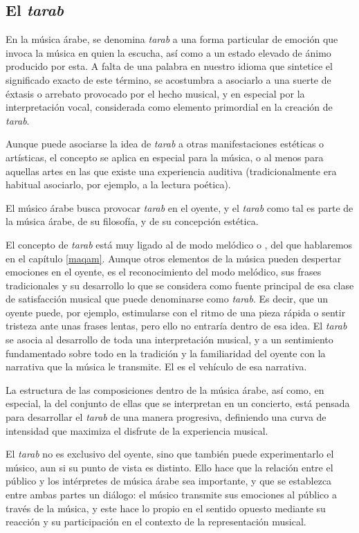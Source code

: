     \subsection{El \emph{tarab}}

    En la música árabe, se denomina \emph{tarab} a una forma particular de emoción que invoca la música en quien la escucha, así como a un estado elevado de ánimo producido por esta. A falta de una palabra en nuestro idioma que sintetice el significado exacto de este término, se acostumbra a asociarlo a una suerte de éxtasis o arrebato provocado por el hecho musical, y en especial por la interpretación vocal, considerada como elemento primordial en la creación de \emph{tarab}.

    Aunque puede asociarse la idea de \emph{tarab} a otras manifestaciones estéticas o artísticas, el concepto se aplica en especial para la música, o al menos para aquellas artes en las que existe una experiencia auditiva (tradicionalmente era habitual asociarlo, por ejemplo, a la lectura poética).

    El músico árabe busca provocar \emph{tarab} en el oyente, y el \emph{tarab} como tal es parte de la música árabe, de su filosofía, y de su concepción estética.

    El concepto de \emph{tarab} está muy ligado al de modo melódico o \maqamb, del que hablaremos en el capítulo \ref{maqam}. Aunque otros elementos de la música pueden despertar emociones en el oyente, es el reconocimiento del modo melódico, sus frases tradicionales y su desarrollo lo que se considera como fuente principal de esa clase de satisfacción musical que puede denominarse como \emph{tarab}. Es decir, que un oyente puede, por ejemplo, estimularse con el ritmo de una pieza rápida o sentir tristeza ante unas frases lentas, pero ello no entraría dentro de esa idea. El \emph{tarab} se asocia al desarrollo de toda una interpretación musical, y a un sentimiento fundamentado sobre todo en la tradición y la familiaridad del oyente con la narrativa que la música le transmite. El \maqam es el vehículo de esa narrativa.

    La estructura de las composiciones dentro de la música árabe, así como, en especial, la del conjunto de ellas que se interpretan en un concierto, está pensada para desarrollar el \emph{tarab} de una manera progresiva, definiendo una curva de intensidad que maximiza el disfrute de la experiencia musical.

    El \emph{tarab} no es exclusivo del oyente, sino que también puede experimentarlo el músico, aun si su punto de vista es distinto. Ello hace que la relación entre el público y los intérpretes de música árabe sea importante, y que se establezca entre ambas partes un diálogo: el músico transmite sus emociones al público a través de la música, y este hace lo propio en el sentido opuesto mediante su reacción y su participación en el contexto de la representación musical.

